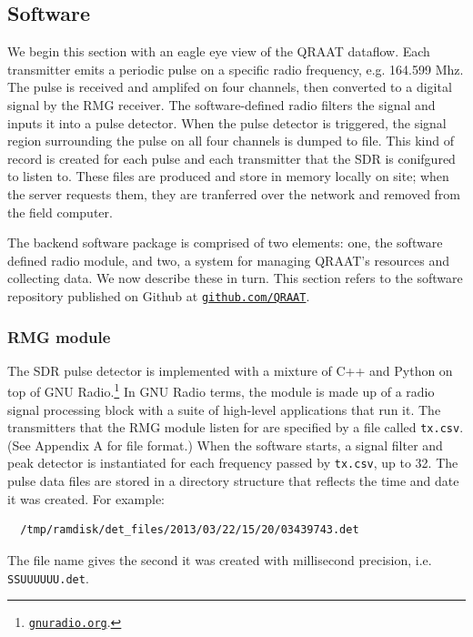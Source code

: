 \documentclass[letter]{article}
\newcounter{foot}
\begin{document}
\subsection{Software}
We begin this section with an eagle eye view of the QRAAT dataflow. Each transmitter emits 
a periodic pulse on a specific radio frequency, e.g. 164.599 Mhz. The pulse is received and
amplifed on four channels, then converted to a digital signal by the RMG receiver.
The software-defined radio filters the signal and inputs it into a pulse detector. When the 
pulse detector is triggered, the signal region surrounding the pulse on all four channels
is dumped to file. This kind of record is created for each pulse and each transmitter
that the SDR is conifgured to listen to. These files are produced and store in memory locally
on site; when the server requests them, they are tranferred over the network and removed from
the field computer. 

The backend software package is comprised of two elements: one, the software defined radio 
module, and two, a system for managing QRAAT's resources and collecting data. We now describe 
these in turn. This section refers to the software repository published on Github at 
\href{http://github.com/QRAAT/QRAAT/}{\tt github.com/QRAAT}.

\subsubsection{RMG module}
The SDR pulse detector is implemented with a mixture of C++ and Python on top of 
GNU Radio.\footnote{\href{http://gnuradio.org/redmine/}{\tt gnuradio.org}.} 
In GNU Radio terms, the module is made up of a radio signal processing block with a suite 
of high-level applications that run it. The transmitters that the RMG module listen for
are specified by a file called \texttt{tx.csv}. (See Appendix A for file format.) When 
the software starts, a signal filter and peak detector is instantiated for each 
frequency passed by \texttt{tx.csv}, up to 32. The pulse data files are stored in a 
directory structure that reflects the time and date it was created. For example: 
\begin{verbatim}
  /tmp/ramdisk/det_files/2013/03/22/15/20/03439743.det
\end{verbatim}
The file name gives the second it was created with millisecond precision, i.e. 
\texttt{SSUUUUUU.det}.
\end{document}
